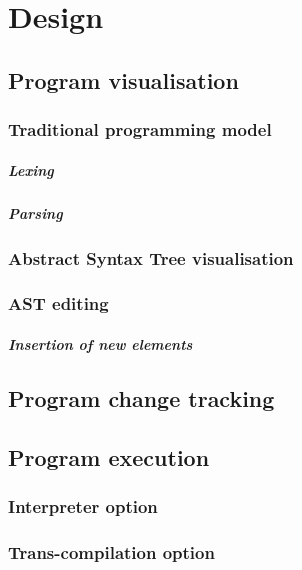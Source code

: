 \chapter{Design}

\section{Program visualisation}

\subsection{Traditional programming model}

\paragraph{Lexing}

\paragraph{Parsing}

\subsection{Abstract Syntax Tree visualisation}

\subsection{AST editing}

\paragraph{Insertion of new elements}

\section{Program change tracking}

\section{Program execution}

\subsection{Interpreter option}

\subsection{Trans-compilation option}

